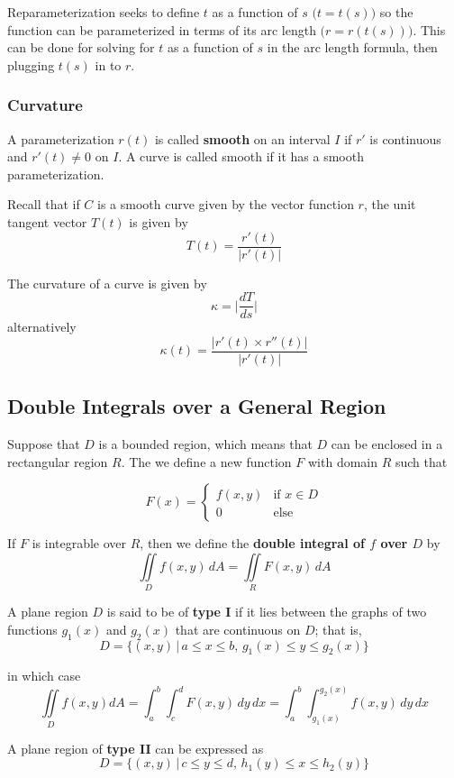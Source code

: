  Reparameterization seeks to define $t$ as a function of $s$ $\big(t = t(s)\big)$ so the function can be parameterized in terms of its arc length $\big(r = r(t(s))\big)$. This can be done for solving for $t$ as a function of $s$ in the arc length formula, then plugging $t(s)$ in to $r$.


\subsubsection{Curvature}

A parameterization $r(t)$ is called \textbf{smooth} on an interval $I$ if $r'$ is continuous and $r'(t) \neq 0$ on $I$. A curve is called smooth if it has a smooth parameterization.

Recall that if $C$ is a smooth curve given by the vector function $r$, the unit tangent vector $T(t)$ is given by $$T(t) = \frac{r'(t)}{|r'(t)|} $$

The curvature of a curve is given by $$\kappa = \Big|\frac{dT}{ds}\Big| $$ alternatively $$\kappa (t) = \frac{|r'(t) \times r''(t)|}{|r'(t)|} $$



\subsection{Double Integrals over a General Region}

Suppose that $D$ is a bounded region, which means that $D$ can be enclosed in a rectangular region $R$. The we define a new function $F$ with domain $R$ such that

$$ F(x) =
\begin{cases}
f(x,y) & \text{if } x \in D\\
0      & \text{else}
\end{cases}
$$

If $F$ is integrable over $R$, then we define the \textbf{double integral of $f$ over $D$} by $$\iint\limits_{D} f(x,y) \, dA = \iint\limits_{R} F(x,y) \, dA$$

A plane region $D$ is said to be of \textbf{type I} if it lies between the graphs of two functions $g_{1}(x)$ and $g_{2}(x)$ that are continuous on $D$; that is, $$D = \big\{ (x,y) \, | \, a \leq x \leq b, \, g_{1}(x) \leq y \leq g_{2}(x) \big\}$$

in which case $$\iint\limits_{D} f(x,y) dA = \int_{a}^{b} \int_{c}^{d} F(x, y) \, dy \, dx = \int_{a}^{b} \int_{g_{1}(x)}^{g_{2}(x)} f(x, y) \, dy \, dx$$

A plane region of \textbf{type II} can be expressed as $$D = \big\{ (x,y) \, | \, c \leq y \leq d, \, h_{1}(y) \leq x \leq h_{2}(y) \big\}$$

